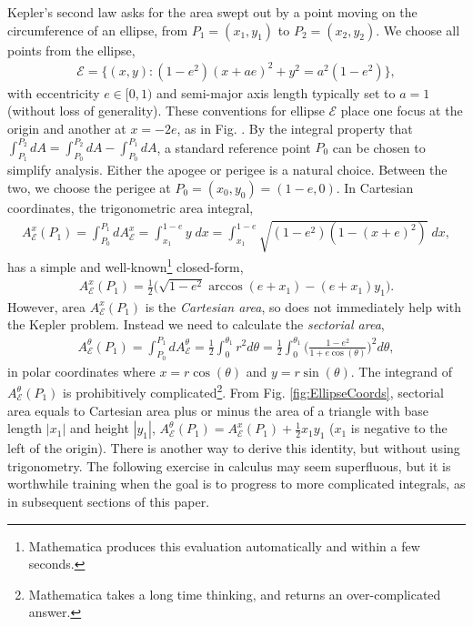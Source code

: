 \documentclass[nofootinbib,preprint]{revtex4-1}
\begin{document}
Kepler's second law asks for the area swept out by a point moving on the circumference 
of an ellipse, from $P_1=(x_1,y_1)$ to  $P_2=(x_2,y_2)$. We choose all points from the 
ellipse,
\begin{eqnarray}
\mathcal{E}=\{(x,y):(1-e^2)(x+a e)^2+y^2=a^2(1-e^2)\}, \nonumber
\end{eqnarray} 
with eccentricity $e \in [0,1)$ and semi-major axis length typically set to $a=1$ 
(without loss of generality). These conventions for ellipse $\mathcal{E}$ 
place one focus at the origin and another at $x=-2e$, as in Fig. . By 
the integral property that ${\int_{P_1}^{P_2} dA = \int_{P_0}^{P_2} dA - \int_{P_0}^{P_1} dA}$, 
a standard reference point $P_0$ can be chosen to simplify analysis. Either the apogee or 
perigee is a natural choice. Between the two, we choose the perigee at ${P_0=(x_0,y_0)=(1-e,0)}$.
In Cartesian coordinates, the trigonometric area integral,\FloatBarrier\noindent  
\begin{eqnarray}
A_{\mathcal{E}}^{x}(P_1) = \int_{P_0}^{P_1} dA_{\mathcal{E}}^{x} 
= \int_{x_1}^{1-e} y\;dx = \int_{x_1}^{1-e}\sqrt{(1-e^2)(1-(x+e)^2)} \;dx, \nonumber
\end{eqnarray}
has a simple and well-known\footnote{Mathematica produces this evaluation 
automatically and within a few seconds.} closed-form,
\begin{eqnarray}
A_{\mathcal{E}}^{x}(P_1) = \frac{1}{2} \Big(\sqrt{1-e^2} \arccos(e+x_1) - (e+x_1)y_1 \Big). \nonumber
\end{eqnarray}
However, area $A_{\mathcal{E}}^{x}(P_1)$ is the \textit{Cartesian area}, so does not immediately help with 
the Kepler problem. Instead we need to calculate the \textit{sectorial area},
\begin{eqnarray}
A_{\mathcal{E}}^{\theta}(P_1)= \int_{P_0}^{P_1}dA_{\mathcal{E}}^{\theta} 
=\frac{1}{2} \int_{0}^{\theta_1} r^2 d\theta = 
\frac{1}{2} \int_{0}^{\theta_1} \Big( \frac{1-e^2}{1+e\cos(\theta)}\Big)^2 d\theta, \nonumber
\end{eqnarray}
in polar coordinates where $x = r\cos(\theta)$ and $y=r\sin(\theta)$. The integrand of 
$A_{\mathcal{E}}^{\theta}(P_1)$ is prohibitively complicated\footnote{Mathematica takes a 
long time thinking, and returns an over-complicated answer.}. From Fig. \ref{fig:EllipseCoords}, 
sectorial area equals to Cartesian area plus or minus the area of a triangle with base 
length $|x_1|$ and height $|y_1|$, 
$A_{\mathcal{E}}^{\theta}(P_1) = A_{\mathcal{E}}^{x}(P_1) + \tfrac{1}{2} x_1 y_1 \nonumber$ 
($x_1$ is negative to the left of the origin). 
There is another way to derive this identity, but without using trigonometry. The following 
exercise in calculus may seem superfluous, but it is worthwhile training when the goal 
is to progress to more complicated integrals, as in subsequent sections of this 
paper.
\end{document}
